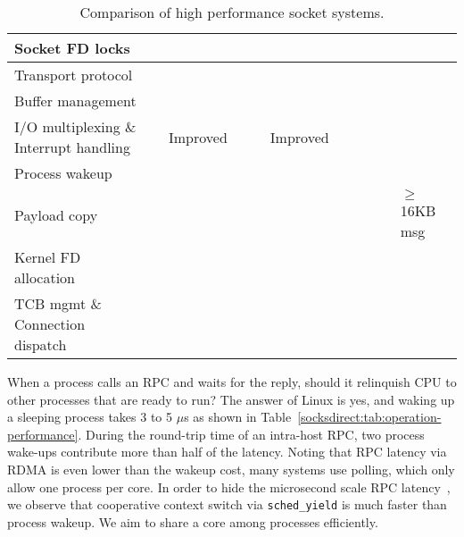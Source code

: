 \begin{table*}[t]
{\begin{tabularx}{1.45\textwidth}{l|X|X|X|X|X|X|X|X|X|X|}
			\hline
			Socket FD locks & & & & & & & & & & \yes \\
			\hline
			Transport protocol & & & & & & & & \yes & \yes & \yes \\
			\hline
			Buffer management & & & & & & & & & & \yes \\
			\hline
			I/O multiplexing \& Interrupt handling & & Improved & \yes & \yes & Improved & \yes & \yes & \yes & \yes & \yes \\
			\hline
			Process wakeup & & & & & & & & & & \yes \\
			\hline
			Payload copy & & \yes & & & \yes & & & & & $\ge$16KB msg \\
			\hline
			Kernel FD allocation & & \yes &  &  & \yes & & & & & \yes \\
			\hline
			TCB mgmt \& Connection dispatch & \yes & \yes & \yes & \yes & \yes & & & & & \yes \\
			\hline
		\end{tabularx}
	}
	\caption{Comparison of high performance socket systems.}
	\label{socksdirect:tab:related-work}
	
\end{table*}




When a process calls an RPC and waits for the reply, should it relinquish CPU to other processes that are ready to run?
The answer of Linux is yes, and waking up a sleeping process takes 3 to 5 $\mu$s as shown in Table~\ref{socksdirect:tab:operation-performance}.
During the round-trip time of an intra-host RPC, two process wake-ups contribute more than half of the latency.
Noting that RPC latency via RDMA is even lower than the wakeup cost, many systems use polling, which only allow one process per core.
In order to hide the microsecond scale RPC latency~\cite{barroso2017attack}, we observe that cooperative context switch via \texttt{sched\_yield} is much faster than process wakeup.
We aim to share a core among processes efficiently.



